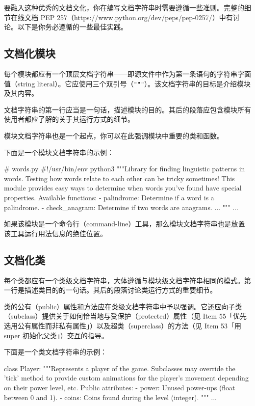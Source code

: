 要融入这种优秀的文档文化，你在编写文档字符串时需要遵循一些准则。完整的细节在线文档 PEP 257（https://www.python.org/dev/peps/pep-0257/）中有讨论。以下是你务必遵循的一些最佳实践。

\subsection{文档化模块}

每个模块都应有一个顶层文档字符串——即源文件中作为第一条语句的字符串字面值（string literal）。它应使用三个双引号（\texttt{"""}）。该文档字符串的目标是介绍模块及其内容。

文档字符串的第一行应当是一句话，描述模块的目的。其后的段落应包含模块所有使用者都应了解的关于其运行方式的细节。

模块文档字符串也是一个起点，你可以在此强调模块中重要的类和函数。

下面是一个模块文档字符串的示例：

\begin{codebox}[python]
# words.py
#!/usr/bin/env python3
"""Library for finding linguistic patterns in words.
Testing how words relate to each other can be tricky sometimes!
This module provides easy ways to determine when words you've
found have special properties.
Available functions:
- palindrome: Determine if a word is a palindrome.
- check_anagram: Determine if two words are anagrams.
...
"""
...
\end{codebox}

如果该模块是一个命令行（command-line）工具，那么模块文档字符串也是放置该工具运行用法信息的绝佳位置。

\subsection{文档化类}

每个类都应有一个类级文档字符串，大体遵循与模块级文档字符串相同的模式。第一行是描述类目的的一句话。其后的段落讨论类运行方式的重要细节。

类的公有（public）属性和方法应在类级文档字符串中予以强调。它还应向子类（subclass）提供关于如何恰当地与受保护（protected）属性（见 Item 55「优先选用公有属性而非私有属性」）以及超类（superclass）的方法（见 Item 53「用 super 初始化父类」）交互的指导。

下面是一个类文档字符串的示例：

\begin{codebox}[python]
class Player:
    """Represents a player of the game.
    Subclasses may override the 'tick' method to provide
    custom animations for the player's movement depending
    on their power level, etc.
    Public attributes:
    - power: Unused power-ups (float between 0 and 1).
    - coins: Coins found during the level (integer).
    """
    ...
\end{codebox}

